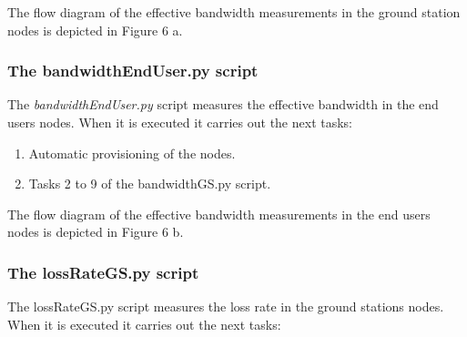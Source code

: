 The flow diagram of the effective bandwidth measurements in the ground station nodes is depicted in Figure 6 a.

\subsubsection{The bandwidthEndUser.py script}

The \emph{bandwidthEndUser.py} script measures the effective bandwidth in the
end users nodes. When it is executed it carries out the next tasks:
\begin{enumerate}
\item Automatic provisioning of the nodes.
\item Tasks 2 to 9 of the bandwidthGS.py script.
\end{enumerate}

The flow diagram of the effective bandwidth measurements in the end users nodes is depicted in Figure 6 b.

\subsubsection{The lossRateGS.py script}

The lossRateGS.py  script measures the loss rate in the ground stations
nodes. When it is executed it carries out the next tasks:

